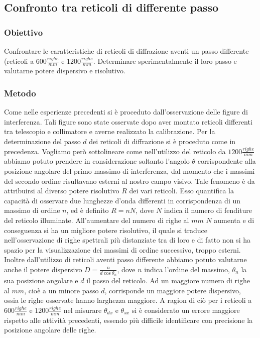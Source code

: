 \documentclass[a4paper]{article}
\begin{document}
\subsection{Confronto tra reticoli di differente passo}

\subsubsection{Obiettivo}
Confrontare le caratteristiche di reticoli di diffrazione aventi un passo differente (reticoli a $600 \frac{righe}{mm}$ e $1200 \frac{righe}{mm}$. Determinare sperimentalmente il loro passo e valutarne potere dispersivo e risolutivo.

\subsubsection{Metodo}
Come nelle esperienze precedenti si è proceduto dall'osservazione delle figure di interferenza. Tali figure sono state osservate dopo aver montato reticoli differenti tra telescopio e collimatore e averne realizzato la calibrazione. Per la determinazione del passo $d$ dei reticoli di diffrazione si è proceduto come in precedenza. Vogliamo però sottolineare come nell'utilizzo del reticolo da $1200 \frac{righe}{mm}$ abbiamo potuto prendere in considerazione soltanto l'angolo $\theta$ corrispondente alla posizione angolare del primo massimo di interferenza, dal momento che i massimi del secondo ordine risultavano esterni al nostro campo visivo. Tale fenomeno è da attribuirsi al diverso potere risolutivo $R$ dei vari reticoli. Esso quantifica la capacità di osservare due lunghezze d'onda differenti in corrispondenza di un massimo di ordine $n$, ed è definito $R=nN$, dove $N$ indica il numero di fenditure del reticolo illuminate. All'aumentare del numero di righe al $mm$ $N$ aumenta e di conseguenza si ha un migliore potere risolutivo, il quale si traduce nell'osservazione di righe spettrali più distanziate tra di loro e di fatto non si ha spazio per la visualizzazione dei massimi di ordine successivo, troppo esterni.
Inoltre dall'utilizzo di reticoli aventi passo differente abbiamo potuto valutarne anche il potere dispersivo $D=\frac{n}{d\cos{\theta_n}}$, dove $n$ indica l'ordine del massimo, $\theta_n$ la sua posizione angolare e $d$ il passo del reticolo. Ad un maggiore numero di righe al $mm$, cioè a un minore passo $d$, corrisponde un maggiore potere dispersivo, ossia le righe osservate hanno larghezza maggiore. A ragion di ciò per i reticoli a $600 \frac{righe}{mm}$ e $1200 \frac{righe}{mm}$ nel misurare $\theta_{dx}$ e $\theta_{sx}$ si è considerato un errore maggiore rispetto alle attività precedenti, essendo più difficile identificare con precisione la posizione angolare delle righe.
\end{document}
